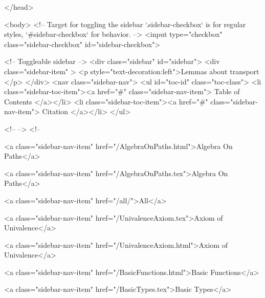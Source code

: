   
</head>




  <body>
    <!-- Target for toggling the sidebar `.sidebar-checkbox` is for regular
     styles, `#sidebar-checkbox` for behavior. -->
<input type="checkbox" class="sidebar-checkbox" id="sidebar-checkbox">

<!-- Toggleable sidebar -->
<div class="sidebar" id="sidebar">
  <div class="sidebar-item" >
    <p style="text-decoration:left">Lemmas about transport </p>
  </div>
  <nav class="sidebar-nav">
    <ul id="toc-id" class="toc-class">
  <li class="sidebar-toc-item"><a href="#" class="sidebar-nav-item"> Table of Contents </a></li>
  <li class="sidebar-toc-item"><a href="#" class="sidebar-nav-item"> Citation </a></li>
</ul>


    <!--  -->
    <!-- 
      
    
      
    
      
    
      
        
      
    
      
        
          <a class="sidebar-nav-item" href="/AlgebraOnPaths.html">Algebra On Paths</a>
        
      
    
      
        
          <a class="sidebar-nav-item" href="/AlgebraOnPaths.tex">Algebra On Paths</a>
        
      
    
      
        
          <a class="sidebar-nav-item" href="/all/">All</a>
        
      
    
      
        
          <a class="sidebar-nav-item" href="/UnivalenceAxiom.tex">Axiom of Univalence</a>
        
      
    
      
        
          <a class="sidebar-nav-item" href="/UnivalenceAxiom.html">Axiom of Univalence</a>
        
      
    
      
        
          <a class="sidebar-nav-item" href="/BasicFunctions.html">Basic Functions</a>
        
      
    
      
        
          <a class="sidebar-nav-item" href="/BasicTypes.tex">Basic Types</a>
        
